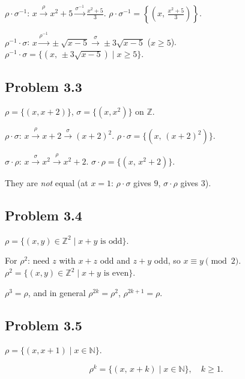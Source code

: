 $\rho\cdot\sigma^{-1}$: $x\xrightarrow{\rho}x^2+5\xrightarrow{\sigma^{-1}}\tfrac{x^2+5}{3}$. \;$\boxed{\rho\cdot\sigma^{-1}=\left\{\left(x,\,\tfrac{x^2+5}{3}\right)\right\}}$.

$\rho^{-1}\cdot\sigma$: $x\xrightarrow{\rho^{-1}}\pm\sqrt{x-5}\xrightarrow{\sigma}\pm 3\sqrt{x-5}$ \;($x\ge 5$). \;$\boxed{\rho^{-1}\cdot\sigma=\{(x,\,\pm 3\sqrt{x-5})\mid x\ge 5\}}$.


\subsection*{Problem 3.3}

$\rho=\{(x,x+2)\}$, $\sigma=\{(x,x^2)\}$ on $\mathbb{Z}$.

$\rho\cdot\sigma$: $x\xrightarrow{\rho}x+2\xrightarrow{\sigma}(x+2)^2$. \;$\boxed{\rho\cdot\sigma=\{(x,\,(x+2)^2)\}}$.

$\sigma\cdot\rho$: $x\xrightarrow{\sigma}x^2\xrightarrow{\rho}x^2+2$. \;$\boxed{\sigma\cdot\rho=\{(x,\,x^2+2)\}}$.

They are \emph{not} equal (at $x=1$: $\rho\cdot\sigma$ gives $9$, $\sigma\cdot\rho$ gives $3$).


\subsection*{Problem 3.4}

$\rho=\{(x,y)\in\mathbb{Z}^2\mid x+y \text{ is odd}\}$.

For $\rho^2$: need $z$ with $x+z$ odd and $z+y$ odd, so $x\equiv y\pmod{2}$.
$\boxed{\rho^2=\{(x,y)\in\mathbb{Z}^2\mid x+y \text{ is even}\}}$.

$\boxed{\rho^3=\rho}$, and in general $\rho^{2k}=\rho^2$, $\rho^{2k+1}=\rho$.


\subsection*{Problem 3.5}

$\rho=\{(x,x+1)\mid x\in\mathbb{N}\}$.

\[\boxed{\rho^k=\{(x,\,x+k)\mid x\in\mathbb{N}\},\quad k\ge 1.}\]


